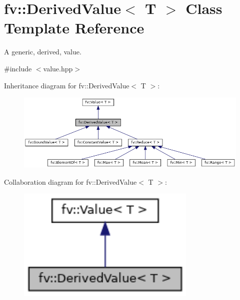 \hypertarget{classfv_1_1DerivedValue}{}\section{fv\+:\+:Derived\+Value$<$ T $>$ Class Template Reference}
\label{classfv_1_1DerivedValue}


A generic, derived, value.  




{\ttfamily \#include $<$value.\+hpp$>$}



Inheritance diagram for fv\+:\+:Derived\+Value$<$ T $>$\+:
\nopagebreak
\begin{figure}[H]
\begin{center}
\leavevmode
\includegraphics[width=350pt]{classfv_1_1DerivedValue__inherit__graph}
\end{center}
\end{figure}


Collaboration diagram for fv\+:\+:Derived\+Value$<$ T $>$\+:
\nopagebreak
\begin{figure}[H]
\begin{center}
\leavevmode
\includegraphics[width=243pt]{classfv_1_1DerivedValue__coll__graph}
\end{center}
\end{figure}
